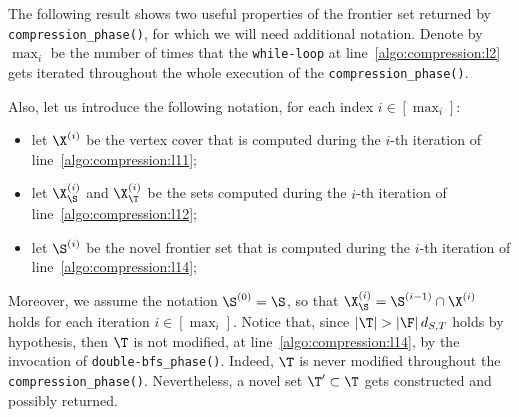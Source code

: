 The following result shows two useful properties of the frontier set returned by \texttt{compression\_phase()}, for which we will need additional notation.
Denote by $\max_i$ be the number of times that the \texttt{while-loop}
at line~\ref{algo:compression:l2} gets iterated throughout
the whole execution of the \texttt{compression\_phase()}.


Also, let us introduce the following notation, for each index $i\in [\max_i]$:
\begin{itemize}
\item let $\X^{(i)}$ be the vertex cover that is computed during the $i$-th iteration of line~\ref{algo:compression:l11};
\item let $\X_\S^{(i)}$ and $\X_\T^{(i)}$ be the sets computed during the $i$-th iteration of line~\ref{algo:compression:l12};
\item let $\S^{(i)}$ be the novel frontier set that is computed during the $i$-th iteration of line~\ref{algo:compression:l14};
\end{itemize}
Moreover, we assume the notation $\S^{(0)}=\S$,
so that $\X_\S^{(i)}=\S^{(i-1)}\cap \X^{(i)}$ holds for each iteration $i\in [\max_i]$.
Notice that, since $|\T| > |\F|\, d_{S,T}$ holds by hypothesis,
then $\T$ is not modified, at line~\ref{algo:compression:l14}, by the invocation of \texttt{double-bfs\_phase()}.
Indeed, $\T$ is never modified throughout the \texttt{compression\_phase()}.
Nevertheless, a novel set $\T'\subset\T$ gets constructed and possibly returned.


